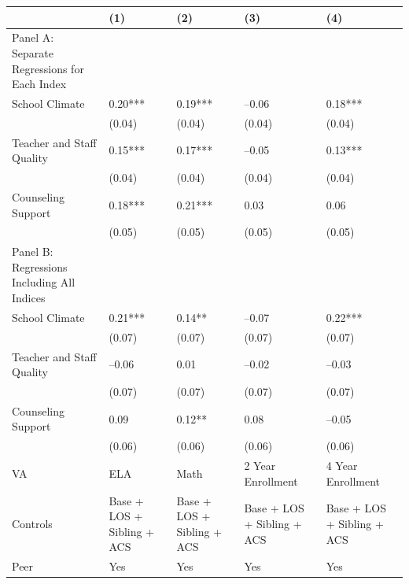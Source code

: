 \documentclass{article}
\begin{document}
\begin{table}[tbp] \centering
{}

{\footnotesize
\begin{tabularx}{\linewidth}{lCCCC}

\toprule
&{(1)}&{(2)}&{(3)}&{(4)} \tabularnewline
\midrule \addlinespace[\belowrulesep]
Panel A: Separate Regressions for Each Index&&&& \tabularnewline
\midrule School Climate&0.20***&0.19***&--0.06&0.18*** \tabularnewline
&(0.04)&(0.04)&(0.04)&(0.04) \tabularnewline
Teacher and Staff Quality&0.15***&0.17***&--0.05&0.13*** \tabularnewline
&(0.04)&(0.04)&(0.04)&(0.04) \tabularnewline
Counseling Support&0.18***&0.21***&0.03&0.06 \tabularnewline
&(0.05)&(0.05)&(0.05)&(0.05) \tabularnewline
\midrule \midrule Panel B: Regressions Including All Indices&&&& \tabularnewline
\midrule School Climate&0.21***&0.14**&--0.07&0.22*** \tabularnewline
&(0.07)&(0.07)&(0.07)&(0.07) \tabularnewline
Teacher and Staff Quality&--0.06&0.01&--0.02&--0.03 \tabularnewline
&(0.07)&(0.07)&(0.07)&(0.07) \tabularnewline
Counseling Support&0.09&0.12**&0.08&--0.05 \tabularnewline
&(0.06)&(0.06)&(0.06)&(0.06) \tabularnewline
\midrule VA&ELA&Math&2 Year Enrollment&4 Year Enrollment \tabularnewline
Controls&Base + LOS + Sibling + ACS&Base + LOS + Sibling + ACS&Base + LOS + Sibling + ACS&Base + LOS + Sibling + ACS \tabularnewline
Peer&Yes&Yes&Yes&Yes \tabularnewline
\bottomrule 

\end{tabularx}
}
\end{table}
\end{document}
